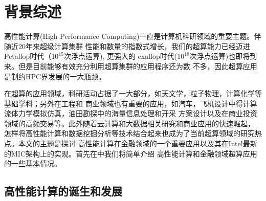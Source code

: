 \chapter{背景综述}

高性能计算(High Performance Computing)一直是计算机科研领域的重要主题。伴随近20年来超级计算集群
性能和数量的指数式增长，我们的超算能力已经迈进Petaflop时代（$10^{15}$次浮点运算), 更强大的
exaflop时代($10^{18}$次浮点运算)也即将到来。但是目前能够有效充分利用超算集群的应用程序还为数
不多，因此超算应用是制约HPC界发展的一大瓶颈。\par
在超算的应用领域，科研活动占据了一大部分，如天文学，粒子物理，计算化学等基础学科；另外在工程和
商业领域也有重要的应用，如汽车，飞机设计中得计算流体力学模拟仿真，油田勘探中的海量信息处理和开采
方案设计以及在商业投资领域的高频交易等。此外随着云计算和大数据相关研究和商业应用的快速崛起，
怎样将高性能计算和数据挖掘分析等技术结合起来也成为了当前超算领域的研究热点。本文的主题是探讨
高性能计算在金融领域的一个重要应用以及其在Intel最新的MIC架构上的实现。首先在中我们将简单介绍
高性能计算和金融领域超算应用的一些基本情况。

\section{高性能计算的诞生和发展} %
\label{sec:intro-hpc}

